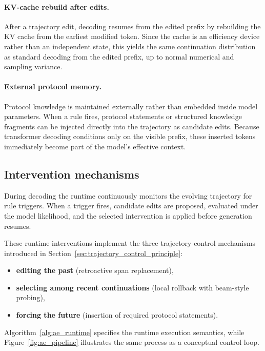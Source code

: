 \documentclass[twocolumn]{article}
\begin{document}
\paragraph{KV-cache rebuild after edits.}
After a trajectory edit, decoding resumes from the edited prefix by rebuilding
the KV cache from the earliest modified token. Since the cache is an efficiency
device rather than an independent state, this yields the same continuation
distribution as standard decoding from the edited prefix, up to normal numerical
and sampling variance.

\paragraph{External protocol memory.}

Protocol knowledge is maintained externally rather than embedded inside model
parameters. When a rule fires, protocol statements or structured knowledge
fragments can be injected directly into the trajectory as candidate edits.
Because transformer decoding conditions only on the visible prefix, these
inserted tokens immediately become part of the model's effective context.

\subsection{Intervention mechanisms}

During decoding the runtime continuously monitors the evolving trajectory for
rule triggers. When a trigger fires, candidate edits are proposed, evaluated
under the model likelihood, and the selected intervention is applied before
generation resumes.

These runtime interventions implement the three trajectory-control mechanisms
introduced in Section~\ref{sec:trajectory_control_principle}:

\begin{itemize}
  \item \textbf{editing the past} (retroactive span replacement),
  \item \textbf{selecting among recent continuations} (local rollback with
    beam-style probing),
  \item \textbf{forcing the future} (insertion of required protocol statements).
\end{itemize}

Algorithm~\ref{alg:ae_runtime} specifies the runtime execution semantics, while
Figure~\ref{fig:ae_pipeline} illustrates the same process as a conceptual
control loop.
\end{document}
